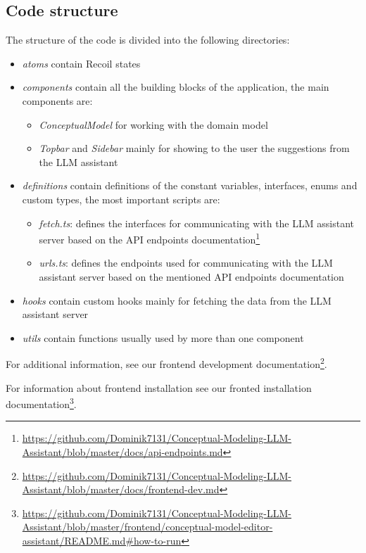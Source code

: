 \subsection{Code structure}

\noindent{}The structure of the code is divided into the following directories:
\begin{itemize}
\item \textit{atoms} contain Recoil states
\item \textit{components} contain all the building blocks of the application, the main components are:
\begin{itemize}
\item \textit{ConceptualModel} for working with the domain model
\item \textit{Topbar} and \textit{Sidebar} mainly for showing to the user the suggestions from the LLM assistant
\end{itemize}
\item \textit{definitions} contain definitions of the constant variables, interfaces, enums and custom types, the most important scripts are:
\begin{itemize}
\item \textit{fetch.ts}: defines the interfaces for communicating with the LLM assistant server based on the API endpoints documentation\footnote{\url{https://github.com/Dominik7131/Conceptual-Modeling-LLM-Assistant/blob/master/docs/api-endpoints.md}}
\item \textit{urls.ts}: defines the endpoints used for communicating with the LLM assistant server based on the mentioned API endpoints documentation
\end{itemize}
\item \textit{hooks} contain custom hooks mainly for fetching the data from the LLM assistant server
\item \textit{utils} contain functions usually used by more than one component
\end{itemize}


\noindent{}For additional information, see our frontend development documentation\footnote{\url{https://github.com/Dominik7131/Conceptual-Modeling-LLM-Assistant/blob/master/docs/frontend-dev.md}}.

For information about frontend installation see our fronted installation documentation\footnote{\url{https://github.com/Dominik7131/Conceptual-Modeling-LLM-Assistant/blob/master/frontend/conceptual-model-editor-assistant/README.md\#how-to-run}}.


